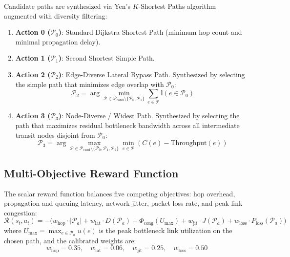 \documentclass[12pt,a4paper,oneside]{report}
\begin{document}
Candidate paths are synthesized via Yen's $K$-Shortest Paths algorithm \cite{yen1971finding} augmented with diversity filtering:
\begin{enumerate}
    \item \textbf{Action 0 ($\mathcal{P}_0$)}: Standard Dijkstra Shortest Path (minimum hop count and minimal propagation delay).
    \item \textbf{Action 1 ($\mathcal{P}_1$)}: Second Shortest Simple Path.
    \item \textbf{Action 2 ($\mathcal{P}_2$)}: Edge-Diverse Lateral Bypass Path. Synthesized by selecting the simple path that minimizes edge overlap with $\mathcal{P}_0$:
    \begin{equation}
        \mathcal{P}_2 = \arg\min_{\mathcal{P} \in \mathcal{P}_{\text{cand}} \setminus \{\mathcal{P}_0, \mathcal{P}_1\}} \sum_{e \in \mathcal{P}} \mathbb{I}(e \in \mathcal{P}_0)
    \end{equation}
    \item \textbf{Action 3 ($\mathcal{P}_3$)}: Node-Diverse / Widest Path. Synthesized by selecting the path that maximizes residual bottleneck bandwidth across all intermediate transit nodes disjoint from $\mathcal{P}_0$:
    \begin{equation}
        \mathcal{P}_3 = \arg\max_{\mathcal{P} \in \mathcal{P}_{\text{cand}} \setminus \{\mathcal{P}_0, \mathcal{P}_1, \mathcal{P}_2\}} \min_{e \in \mathcal{P}} \left( C(e) - \text{Throughput}(e) \right)
    \end{equation}
\end{enumerate}

\subsection{Multi-Objective Reward Function}
The scalar reward function balances five competing objectives: hop overhead, propagation and queuing latency, network jitter, packet loss rate, and peak link congestion:
\begin{equation}
    \mathcal{R}(s_t, a_t) = - \Big( w_{\text{hop}} \cdot |\mathcal{P}_a| + w_{\text{lat}} \cdot D(\mathcal{P}_a) + \Phi_{\text{cong}}(U_{\max}) + w_{\text{jit}} \cdot J(\mathcal{P}_a) + w_{\text{loss}} \cdot P_{\text{loss}}(\mathcal{P}_a) \Big)
    \label{eq:multi_objective_reward}
\end{equation}
where $U_{\max} = \max_{e \in \mathcal{P}_a} u(e)$ is the peak bottleneck link utilization on the chosen path, and the calibrated weights are:
\begin{equation}
    w_{\text{hop}} = 0.35, \quad w_{\text{lat}} = 0.06, \quad w_{\text{jit}} = 0.25, \quad w_{\text{loss}} = 0.50
\end{equation}
\end{document}
